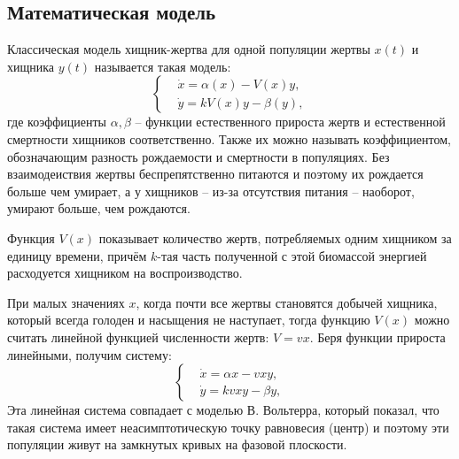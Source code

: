 \subsection{Математическая модель}
    Классическая модель хищник-жертва для одной популяции жертвы \(x(t)\) и хищника \(y(t)\) называется такая модель\cite{svilog}:
    \[
        \left\{\begin{split}
            & \dot{x} = \alpha(x) - V(x)y, \\
            & \dot{y} = k V(x)y -\beta(y),
        \end{split}\right.
    \]
    где коэффициенты \( \alpha, \beta \) -- функции естественного прироста жертв и естественной смертности хищников соответственно. Также их можно называть коэффициентом, обозначающим разность рождаемости и смертности в популяциях. Без взаимодеиствия жертвы беспрепятственно питаются и поэтому их рождается больше чем умирает, а у хищников -- из-за отсутствия питания -- наоборот, умирают больше, чем рождаются.

    Функция \( V(x) \) показывает количество жертв, потребляемых одним хищником за единицу времени, причём \(k\)-тая часть полученной с этой биомассой энергией расходуется хищником на воспроизводство. 
    
    При малых значениях \(x\), когда почти все жертвы становятся добычей хищника, который всегда голоден и насыщения не наступает, тогда функцию \( V(x) \) можно считать линейной функцией численности жертв: \( V = vx \). Беря функции прироста линейными, получим систему:
    \[
        \left\{\begin{split}
            & \dot{x} = \alpha x - v x y, \\
            & \dot{y} = k v x y - \beta y,
        \end{split}\right.
    \]
    Эта линейная система совпадает с моделью В. Вольтерра, который показал, что такая система имеет неасимптотическую точку равновесия (центр) и поэтому эти популяции живут на замкнутых кривых на фазовой плоскости\cite{svilog}.

